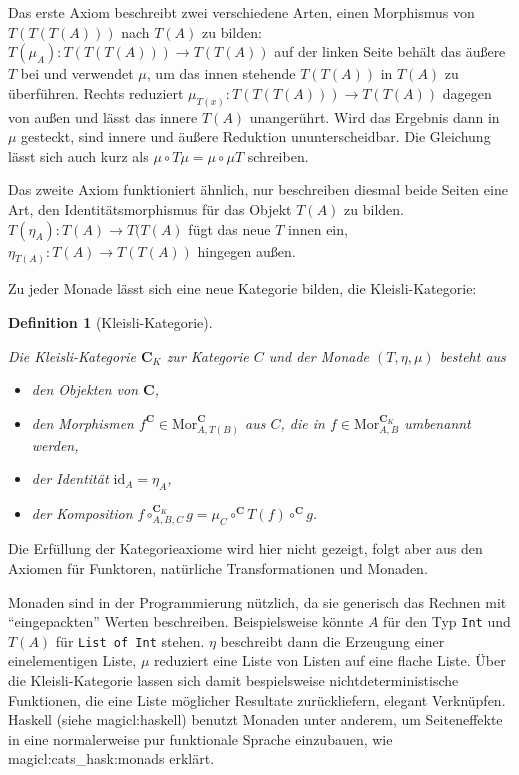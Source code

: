 \documentclass[a4paper, bibgerm]{book}
\newcommand\icode[1]{\lstinline?#1?}
\newcommand\sref{}
\newcommand\ato{\rightarrow} %
\newtheorem{defini}{Definition}
\newcommand{\defi}[2]{%
  \begin{defini}[#1]
    \label{def:#1}
    #2
  \end{defini}
}
\begin{document}
Das erste Axiom beschreibt zwei verschiedene Arten, einen Morphismus von
$T(T(T(A)))$ nach $T(A)$ zu bilden: $T(\mu_A):T(T(T(A))) \ato T(T(A))$
auf der linken Seite behält das äußere $T$ bei und verwendet $\mu$, um
das innen stehende $T(T(A))$ in $T(A)$ zu überführen. Rechts reduziert
$\mu_{T(x)}:T(T(T(A))) \ato T(T(A))$ dagegen von außen und lässt das
innere $T(A)$ unangerührt. Wird das Ergebnis dann in $\mu$ gesteckt,
sind innere und äußere Reduktion ununterscheidbar. Die Gleichung lässt
sich auch kurz als $\mu \circ T \mu = \mu \circ \mu T$ schreiben.

Das zweite Axiom funktioniert ähnlich, nur beschreiben diesmal beide
Seiten eine Art, den Identitätsmorphismus für das Objekt $T(A)$ zu
bilden. $T(\eta_A):T(A) \ato T(T(A)$ fügt das neue $T$ innen ein,
$\eta_{T(A)}:T(A) \ato T(T(A))$ hingegen außen.

Zu jeder Monade lässt sich eine neue Kategorie bilden, die Kleisli-Kategorie:
\defi{Kleisli-Kategorie}{
Die Kleisli-Kategorie $\mathbf{C}_K$ zur Kategorie $C$ und der
Monade $(T,\eta,\mu)$ besteht aus
\begin{itemize}
\item den Objekten von $\mathbf{C}$,
\item den Morphismen $f^{\mathbf{C}} \in
  \mathrm{Mor}^{\mathbf{C}}_{A,T(B)}$ aus $C$, die in $f \in
  \mathrm{Mor}^{\mathbf{C}_K}_{A,B}$ umbenannt werden,
\item der Identität $\mathrm{id}_A = \eta_A$,
\item der Komposition $f \circ^{\mathbf{C}_K}_{A,B,C} g = \mu_C
  \circ^{\mathbf{C}} T(f) \circ^{\mathbf{C}} g$.
\end{itemize}
}
Die Erfüllung der Kategorieaxiome wird hier nicht gezeigt, folgt aber
aus den Axiomen für Funktoren, natürliche Transformationen und Monaden.

Monaden sind in der Programmierung nützlich, da sie generisch das
Rechnen mit "`eingepackten"' Werten beschreiben. Beispielsweise könnte
$A$ für den Typ \icode{Int} und $T(A)$ für \icode{List of Int}
stehen. $\eta$ beschreibt dann die Erzeugung einer einelementigen Liste,
$\mu$ reduziert eine Liste von Listen auf eine flache Liste. Über die
Kleisli-Kategorie lassen sich damit bespielsweise nichtdeterministische
Funktionen, die eine Liste möglicher Resultate zurückliefern, elegant
Verknüpfen. Haskell (siehe \sref{magicl:haskell}) benutzt Monaden unter
anderem, um Seiteneffekte in eine normalerweise pur funktionale Sprache
einzubauen, wie \sref{magicl:cats_hask:monads} erklärt.
\end{document}
